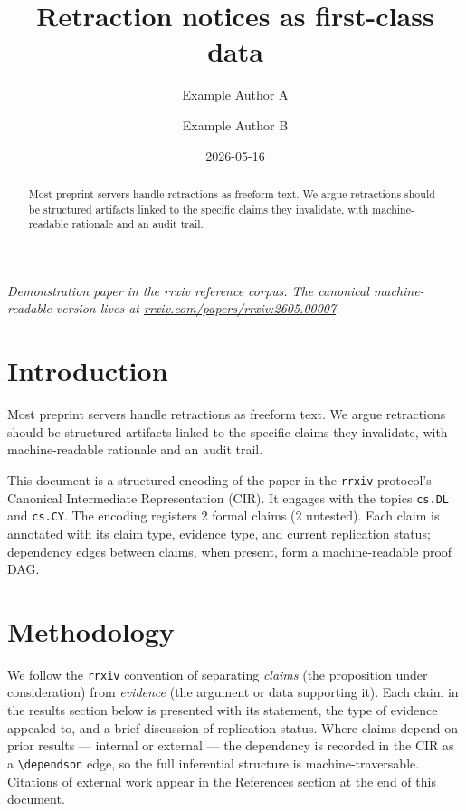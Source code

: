 \documentclass{rrxiv}
\title{Retraction notices as first-class data}
\author{Example Author A \and Example Author B}
\date{2026-05-16}
\begin{document}
\maketitle

\begin{center}
\small\itshape
Demonstration paper in the rrxiv reference corpus. The canonical machine-readable version lives at \href{https://rrxiv.com/papers/rrxiv:2605.00007}{rrxiv.com/papers/rrxiv:2605.00007}.
\end{center}

\begin{abstract}
Most preprint servers handle retractions as freeform text. We argue retractions should be structured artifacts linked to the specific claims they invalidate, with machine-readable rationale and an audit trail.
\end{abstract}

\section{Introduction}
Most preprint servers handle retractions as freeform text. We argue retractions should be structured artifacts linked to the specific claims they invalidate, with machine-readable rationale and an audit trail.

This document is a structured encoding of the paper in the \texttt{rrxiv} protocol's Canonical Intermediate Representation (CIR). It engages with the topics \texttt{cs.DL} and \texttt{cs.CY}. The encoding registers 2 formal claims (2 untested). Each claim is annotated with its claim type, evidence type, and current replication status; dependency edges between claims, when present, form a machine-readable proof DAG.

\section{Methodology}
We follow the \texttt{rrxiv} convention of separating \emph{claims} (the proposition under consideration) from \emph{evidence} (the argument or data supporting it). Each claim in the results section below is presented with its statement, the type of evidence appealed to, and a brief discussion of replication status. Where claims depend on prior results --- internal or external --- the dependency is recorded in the CIR as a \texttt{\textbackslash dependson} edge, so the full inferential structure is machine-traversable. Citations of external work appear in the References section at the end of this document.
\end{document}
